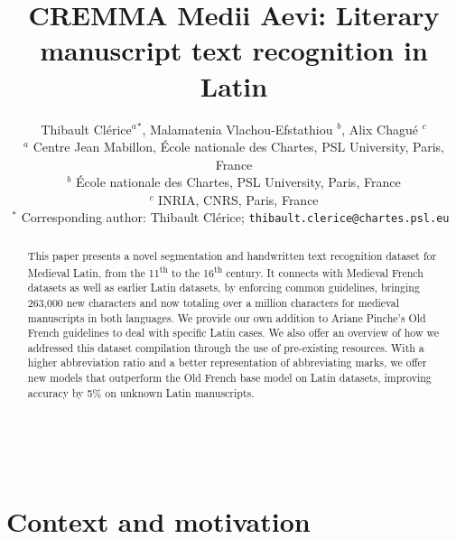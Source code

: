 \documentclass{article}
\title{CREMMA Medii Aevi: Literary manuscript text recognition in Latin}
\author{%
    Thibault Clérice$^{a}$$^{*}$,
    Malamatenia Vlachou-Efstathiou $^{b}$,
    Alix Chagué $^{c}$  \\
    \small $^{a}$ Centre Jean Mabillon, École nationale des Chartes, PSL University, Paris, France \\
    \small $^{b}$ École nationale des Chartes, PSL University, Paris, France \\
    \small $^{c}$ INRIA, CNRS, Paris, France \\
    \small $^{*}$ Corresponding author: Thibault Clérice; \tt{thibault.clerice@chartes.psl.eu}
}
\date{} %
\begin{document}
\maketitle

\begin{abstract} 
\noindent %
This paper presents a novel segmentation and handwritten text recognition dataset for Medieval Latin, from the 11\textsuperscript{th} to the 16\textsuperscript{th} century. It connects with Medieval French datasets as well as earlier Latin datasets, by enforcing common guidelines, bringing 263,000 new characters and now totaling over a million characters for medieval manuscripts in both languages. We provide our own addition to Ariane Pinche's Old French guidelines to deal with specific Latin cases. We also offer an overview of how we addressed this dataset compilation through the use of pre-existing resources. With a higher abbreviation ratio and a better representation of abbreviating marks, we offer new models that outperform the Old French base model on Latin datasets, improving accuracy by 5\% on unknown Latin manuscripts. %
\end{abstract}

\noindent{}\\

\noindent{} 

\section{Context and motivation}
\end{document}
